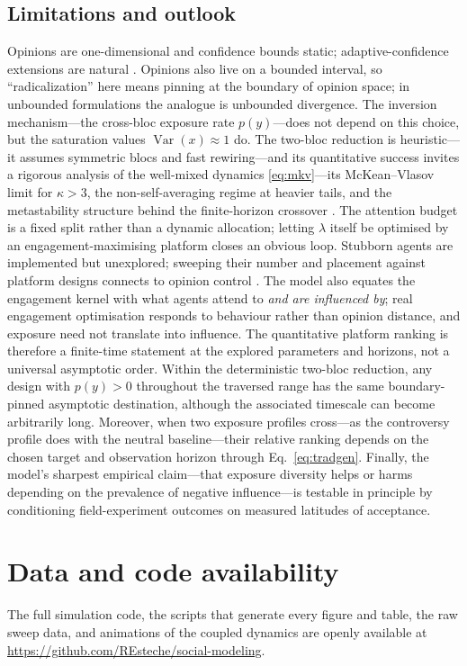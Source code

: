 \documentclass[5p,times,twocolumn]{elsarticle}
\begin{document}
\subsection{Limitations and outlook} Opinions are one-dimensional and
confidence bounds static; adaptive-confidence extensions are natural
\citep{li2025}. Opinions also live on a bounded interval, so
``radicalization'' here means pinning at the boundary of opinion space;
in unbounded formulations \citep{baumann2020} the analogue is unbounded
divergence. The inversion mechanism---the cross-bloc exposure rate
$p(y)$---does not depend on this choice, but the saturation values
$\operatorname{Var}(x) \approx 1$ do. The two-bloc reduction is heuristic---it assumes
symmetric blocs and fast rewiring---and its quantitative success invites
a rigorous analysis of the well-mixed dynamics \eqref{eq:mkv}---its
McKean--Vlasov limit for $\kappa > 3$, the non-self-averaging regime at
heavier tails, and the metastability structure behind the finite-horizon
crossover \citep{castellano2009, bernardo2024}. The attention budget is a fixed
split rather than a dynamic allocation; letting $\lambda$ itself be
optimised by an engagement-maximising platform closes an obvious loop.
Stubborn agents are implemented but unexplored; sweeping their number and
placement against platform designs connects to opinion control
\citep{tian2018}. The model also equates the engagement kernel with what
agents attend to \emph{and are influenced by}; real engagement
optimisation responds to behaviour rather than opinion distance, and
exposure need not translate into influence. The quantitative platform ranking is therefore a finite-time statement
at the explored parameters and horizons, not a universal asymptotic order.
Within the deterministic two-bloc reduction, any design with $p(y)>0$
throughout the traversed range has the same boundary-pinned asymptotic
destination, although the associated timescale can become arbitrarily
long. Moreover, when two exposure profiles cross---as the controversy
profile does with the neutral baseline---their relative ranking depends on
the chosen target and observation horizon through Eq.~\eqref{eq:tradgen}. Finally, the
model's sharpest empirical claim---that
exposure diversity helps or harms depending on the prevalence of negative
influence---is testable in principle by conditioning field-experiment
outcomes on measured latitudes of acceptance.

\section*{Data and code availability}
The full simulation code, the scripts that generate every figure and table,
the raw sweep data, and animations of the coupled dynamics are openly
available at \url{https://github.com/REsteche/social-modeling}.
\end{document}
